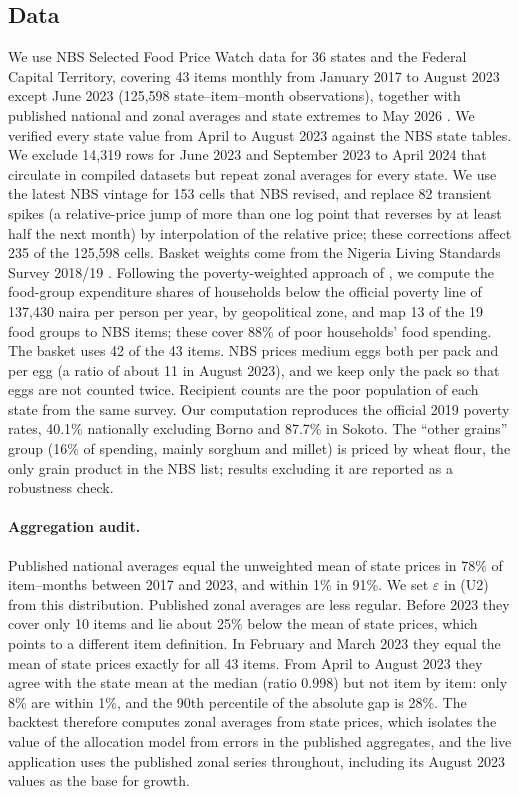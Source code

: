 \documentclass[preprint,12pt,number]{elsarticle}%
\theoremstyle{definition}
\theoremstyle{remark}
\begin{document}
\subsection{Data}
We use NBS Selected Food Price Watch data for 36 states and the Federal Capital Territory, covering 43 items monthly from January 2017 to August 2023 except June 2023 (125,598 state--item--month observations), together with published national and zonal averages and state extremes to May 2026 \citep{nbs2026econs}. We verified every state value from April to August 2023 against the NBS state tables. We exclude 14,319 rows for June 2023 and September 2023 to April 2024 that circulate in compiled datasets but repeat zonal averages for every state. We use the latest NBS vintage for 153 cells that NBS revised, and replace 82 transient spikes (a relative-price jump of more than one log point that reverses by at least half the next month) by interpolation of the relative price; these corrections affect 235 of the 125,598 cells. Basket weights come from the Nigeria Living Standards Survey 2018/19 \citep{nlss2019}. Following the poverty-weighted approach of \citet{deaton2011ppp}, we compute the food-group expenditure shares of households below the official poverty line of 137,430 naira per person per year, by geopolitical zone, and map 13 of the 19 food groups to NBS items; these cover 88\% of poor households' food spending. The basket uses 42 of the 43 items. NBS prices medium eggs both per pack and per egg (a ratio of about 11 in August 2023), and we keep only the pack so that eggs are not counted twice. Recipient counts are the poor population of each state from the same survey. Our computation reproduces the official 2019 poverty rates, 40.1\% nationally excluding Borno and 87.7\% in Sokoto. The ``other grains'' group (16\% of spending, mainly sorghum and millet) is priced by wheat flour, the only grain product in the NBS list; results excluding it are reported as a robustness check.

\paragraph{Aggregation audit.} Published national averages equal the unweighted mean of state prices in 78\% of item--months between 2017 and 2023, and within 1\% in 91\%. We set $\varepsilon$ in (U2) from this distribution. Published zonal averages are less regular. Before 2023 they cover only 10 items and lie about 25\% below the mean of state prices, which points to a different item definition. In February and March 2023 they equal the mean of state prices exactly for all 43 items. From April to August 2023 they agree with the state mean at the median (ratio 0.998) but not item by item: only 8\% are within 1\%, and the 90th percentile of the absolute gap is 28\%. The backtest therefore computes zonal averages from state prices, which isolates the value of the allocation model from errors in the published aggregates, and the live application uses the published zonal series throughout, including its August 2023 values as the base for growth.
\end{document}
